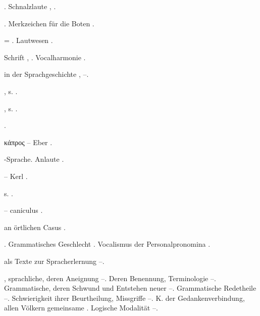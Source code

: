 \begin{register}
 \pageref{sp.160}

. Schnalzlaute \pageref{sp.34}, \sed{\pageref{sp.199},} \pageref{sp.269}.

. Merkzeichen für die Boten \pageref{sp.127}.

 = . Lautwesen \pageref{sp.34}.

  Schrift \pageref{sp.129}, \sed{\pageref{sp.417}}. Vocalharmonie \pageref{sp.403}.


   in der Sprachgeschichte \pageref{sp.17}, \sed{\pageref{sp.143},} \pageref{sp.261}–\pageref{sp.262}.

, s. .

, s. .

 \pageref{sp.282}.

κάπρος – Eber \pageref{sp.224}.

-Sprache. Anlaute \pageref{sp.201}.

 – Kerl \pageref{sp.230}.

 s. .

 – caniculus \pageref{sp.435}.

  an örtlichen Casus \pageref{sp.462}.

. Grammatisches Geschlecht \pageref{sp.390}. Vocalismus der Personalpronomina \pageref{sp.409}.

 als Texte zur Spracherlernung \pageref{sp.73}–\pageref{sp.75}.

, sprachliche, deren Aneignung \pageref{sp.63}–\pageref{sp.64}. Deren Benennung, Terminologie \pageref{sp.114}–\pageref{sp.116}. Grammatische, deren Schwund und Entstehen neuer \pageref{sp.253}–\pageref{sp.255}. Grammatische Redetheile \pageref{sp.381}–\pageref{sp.385}. Schwierigkeit ihrer Beurtheilung, Missgriffe \pageref{sp.405}–\pageref{sp.408}. K. der Gedankenverbindung, allen Völkern gemeinsame \pageref{sp.464}. Logische Modalität \pageref{sp.470}–\pageref{sp.472}.


\end{register}
